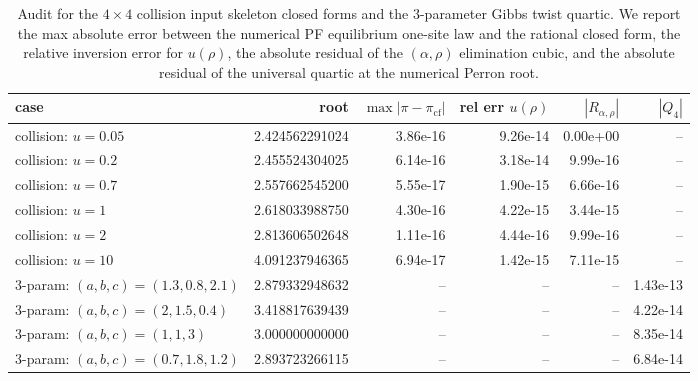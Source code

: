 \begin{table}[H]
\centering
\scriptsize
\setlength{\tabcolsep}{6pt}
\caption{Audit for the $4\times4$ collision input skeleton closed forms and the $3$-parameter Gibbs twist quartic. We report the max absolute error between the numerical PF equilibrium one-site law and the rational closed form, the relative inversion error for $u(\rho)$, the absolute residual of the $(\alpha,\rho)$ elimination cubic, and the absolute residual of the universal quartic at the numerical Perron root.}
\label{tab:collision_input_4x4_gibbs_closed_form_audit}
\begin{tabular}{l r r r r r}
\toprule
case & root & $\max|\pi-\pi_{\mathrm{cf}}|$ & rel err $u(\rho)$ & $|R_{\alpha,\rho}|$ & $|Q_4|$\\
\midrule
collision: $u=0.05$ & 2.424562291024 & 3.86e-16 & 9.26e-14 & 0.00e+00 & --\\
collision: $u=0.2$ & 2.455524304025 & 6.14e-16 & 3.18e-14 & 9.99e-16 & --\\
collision: $u=0.7$ & 2.557662545200 & 5.55e-17 & 1.90e-15 & 6.66e-16 & --\\
collision: $u=1$ & 2.618033988750 & 4.30e-16 & 4.22e-15 & 3.44e-15 & --\\
collision: $u=2$ & 2.813606502648 & 1.11e-16 & 4.44e-16 & 9.99e-16 & --\\
collision: $u=10$ & 4.091237946365 & 6.94e-17 & 1.42e-15 & 7.11e-15 & --\\
\midrule
3-param: $(a,b,c)=(1.3,0.8,2.1)$ & 2.879332948632 & -- & -- & -- & 1.43e-13\\
3-param: $(a,b,c)=(2,1.5,0.4)$ & 3.418817639439 & -- & -- & -- & 4.22e-14\\
3-param: $(a,b,c)=(1,1,3)$ & 3.000000000000 & -- & -- & -- & 8.35e-14\\
3-param: $(a,b,c)=(0.7,1.8,1.2)$ & 2.893723266115 & -- & -- & -- & 6.84e-14\\
\bottomrule
\end{tabular}
\end{table}
